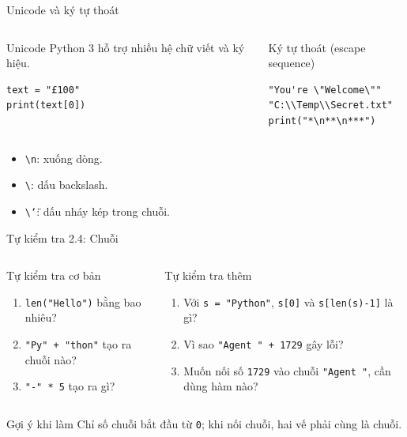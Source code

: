 \documentclass[aspectratio=169,10pt]{beamer}
\begin{document}
\begin{frame}[fragile]{Unicode và ký tự thoát}
\begin{columns}[T,onlytextwidth]
\begin{block}{Unicode}
Python 3 hỗ trợ nhiều hệ chữ viết và ký hiệu.
\begin{lstlisting}
text = "£100"
print(text[0])
\end{lstlisting}
\end{block}
\begin{block}{Ký tự thoát (escape sequence)}
\begin{lstlisting}
"You're \"Welcome\""
"C:\\Temp\\Secret.txt"
print("*\n**\n***")
\end{lstlisting}
\end{block}
\end{columns}
\begin{itemize}
  \item \texttt{\textbackslash n}: xuống dòng.
  \item \texttt{\textbackslash}: dấu backslash.
  \item \texttt{\textbackslash\char`\"}: dấu nháy kép trong chuỗi.
\end{itemize}
\end{frame}

\begin{frame}{Tự kiểm tra 2.4: Chuỗi}
\small
\begin{columns}[T,onlytextwidth]
\begin{block}{Tự kiểm tra cơ bản}
\begin{enumerate}
  \item \texttt{len("Hello")} bằng bao nhiêu?
  \item \texttt{"Py" + "thon"} tạo ra chuỗi nào?
  \item \texttt{"-" * 5} tạo ra gì?
\end{enumerate}
\end{block}
\begin{block}{Tự kiểm tra thêm}
\begin{enumerate}
  \item Với \texttt{s = "Python"}, \texttt{s[0]} và \texttt{s[len(s)-1]} là gì?
  \item Vì sao \texttt{"Agent " + 1729} gây lỗi?
  \item Muốn nối số \texttt{1729} vào chuỗi \texttt{"Agent "}, cần dùng hàm nào?
\end{enumerate}
\end{block}
\end{columns}
\begin{alertblock}{Gợi ý khi làm}
Chỉ số chuỗi bắt đầu từ \texttt{0}; khi nối chuỗi, hai vế phải cùng là chuỗi.
\end{alertblock}
\end{frame}
\end{document}
